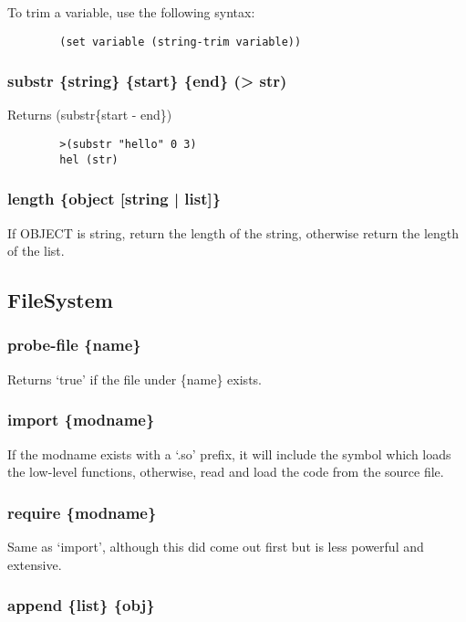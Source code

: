 \documentclass{article}
\begin{document}
	To trim a variable, use the following syntax:
	
	\begin{lstlisting}
		(set variable (string-trim variable))
	\end{lstlisting}

	\subsubsection{substr \{string\} \{start\} \{end\} (> str)}
	
	Returns (substr\{start - end\})
	
	\begin{lstlisting}
		>(substr "hello" 0 3)
		hel (str)
	\end{lstlisting}

	\subsubsection{length \{object [string | list]\}}

	If OBJECT is string, return the length of the string, otherwise return the length of the list.
	\newpage
	\subsection{FileSystem}
	
	\subsubsection{probe-file \{name\}}
	
	Returns `true' if the file under \{name\} exists.
	
	\subsubsection{import \{modname\}}
	
	If the modname exists with a `.so' prefix, it will include the symbol which loads the low-level functions, otherwise, read and load the code from the source file.
	
	\subsubsection{require \{modname\}}
	
	Same as `import', although this did come out first but is less powerful and extensive.
	
	\subsubsection{append \{list\} \{obj\}}
	
\end{document}
